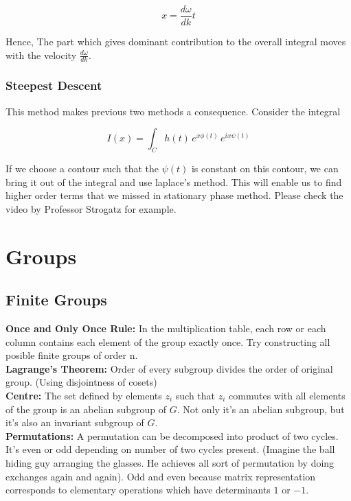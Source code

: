 \documentclass{report}
\begin{document}
$$x = \frac{d\omega}{dk} t$$

\noindent Hence, The part which gives dominant contribution to the overall integral moves with the velocity $\frac{d\omega}{dk}$.

\subsection{Steepest Descent}
This method makes previous two methods a consequence. Consider the integral 

$$I(x) = \int_{C}h(t)\, e^{x\phi(t)}\, e^{ix\psi(t)}$$

\noindent If we choose a contour such that the $\psi(t)$ is constant on this contour, we can bring it out of the integral and use laplace's method. This will enable us to find higher order terms that we missed in stationary phase method. Please check the video by Professor Strogatz for example.\\

\chapter{Groups}

\section{Finite Groups}

\noindent\textbf{Once and Only Once Rule:} In the multiplication table, each row or each column contains each element of the group exactly once. Try constructing all posible finite groups of order n.\\

\noindent\textbf{Lagrange's Theorem:} Order of every subgroup divides the order of original group. (Using disjointness of cosets)\\

\noindent\textbf{Centre:} The set defined by elements $z_i$ such that $z_i$ commutes with all elements of the group is an abelian subgroup of $G$. Not only it's an abelian subgroup, but it's also an invariant subgroup of $G$.\\

\noindent\textbf{Permutations:} A permutation can be decomposed into product of two cycles. It's even or odd depending on number of two cycles present. (Imagine the ball hiding guy arranging the glasses. He achieves all sort of permutation by doing exchanges again and again). Odd and even because matrix representation corresponds to elementary operations which have determinants $1$ or $-1$.\\
\end{document}
